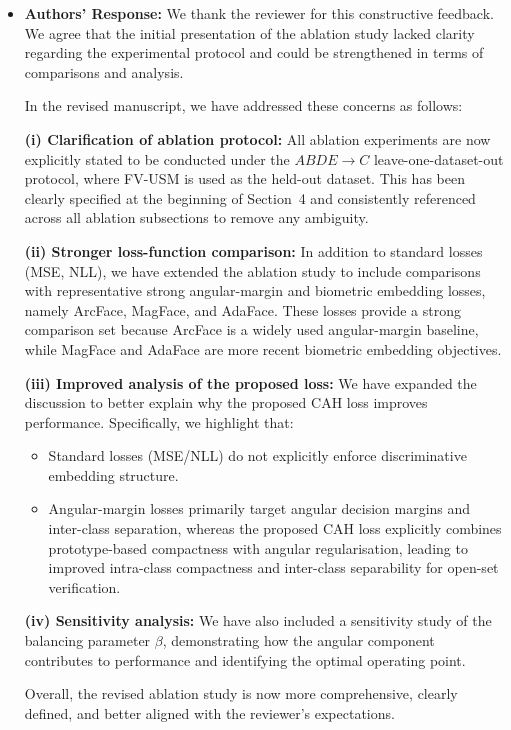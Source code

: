 \documentclass[11pt]{article}
\theoremstyle{remark}
\begin{document}
\begin{itemize}
	\item \textbf{Authors' Response:} 
	We thank the reviewer for this constructive feedback. We agree that the initial presentation of the ablation study lacked clarity regarding the experimental protocol and could be strengthened in terms of comparisons and analysis.

	In the revised manuscript, we have addressed these concerns as follows:

	\textbf{(i) Clarification of ablation protocol:}  
	All ablation experiments are now explicitly stated to be conducted under the $ABDE \rightarrow C$ leave-one-dataset-out protocol, where FV-USM is used as the held-out dataset. This has been clearly specified at the beginning of Section~4 and consistently referenced across all ablation subsections to remove any ambiguity.

	\textbf{(ii) Stronger loss-function comparison:}  
	In addition to standard losses (MSE, NLL), we have extended the ablation study to include comparisons with representative strong angular-margin and biometric embedding losses, namely ArcFace, MagFace, and AdaFace. These losses provide a strong comparison set because ArcFace is a widely used angular-margin baseline, while MagFace and AdaFace are more recent biometric embedding objectives.

	\textbf{(iii) Improved analysis of the proposed loss:}  
	We have expanded the discussion to better explain why the proposed CAH loss improves performance. Specifically, we highlight that:
\begin{itemize}
    \item Standard losses (MSE/NLL) do not explicitly enforce discriminative embedding structure.
    \item Angular-margin losses primarily target angular decision margins and inter-class separation, whereas the proposed CAH loss explicitly combines prototype-based compactness with angular regularisation, leading to improved intra-class compactness and inter-class separability for open-set verification.
\end{itemize}

	\textbf{(iv) Sensitivity analysis:}  
	We have also included a sensitivity study of the balancing parameter $\beta$, demonstrating how the angular component contributes to performance and identifying the optimal operating point.

	Overall, the revised ablation study is now more comprehensive, clearly defined, and better aligned with the reviewer’s expectations.


\end{itemize}
\end{document}
